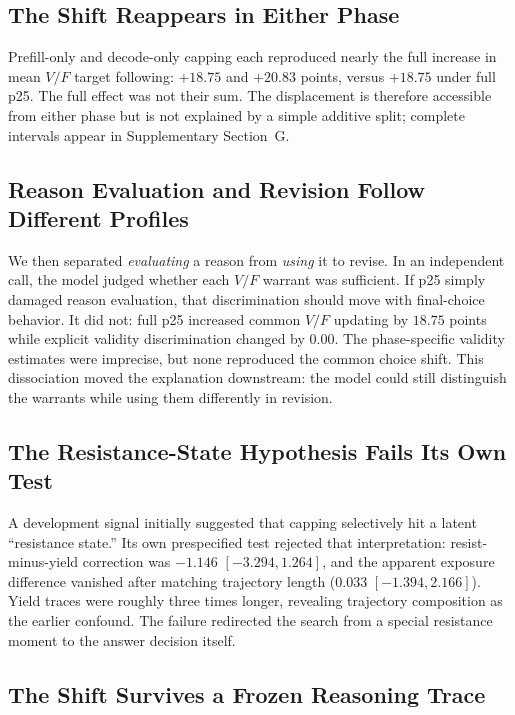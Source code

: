 \documentclass[letterpaper]{article} %
\begin{document}
\subsection{The Shift Reappears in Either Phase}

Prefill-only and decode-only capping each reproduced nearly the full increase in mean $V/F$ target following: $+18.75$ and $+20.83$ points, versus $+18.75$ under full p25. The full effect was not their sum. The displacement is therefore accessible from either phase but is not explained by a simple additive split; complete intervals appear in Supplementary Section~G.

\subsection{Reason Evaluation and Revision Follow Different Profiles}

We then separated \emph{evaluating} a reason from \emph{using} it to revise. In an independent call, the model judged whether each $V/F$ warrant was sufficient. If p25 simply damaged reason evaluation, that discrimination should move with final-choice behavior. It did not: full p25 increased common $V/F$ updating by $18.75$ points while explicit validity discrimination changed by $0.00$. The phase-specific validity estimates were imprecise, but none reproduced the common choice shift. This dissociation moved the explanation downstream: the model could still distinguish the warrants while using them differently in revision.

\subsection{The Resistance-State Hypothesis Fails Its Own Test}

A development signal initially suggested that capping selectively hit a latent ``resistance state.'' Its own prespecified test rejected that interpretation: resist-minus-yield correction was $-1.146$ $[-3.294,1.264]$, and the apparent exposure difference vanished after matching trajectory length ($0.033$ $[-1.394,2.166]$). Yield traces were roughly three times longer, revealing trajectory composition as the earlier confound. The failure redirected the search from a special resistance moment to the answer decision itself.

\subsection{The Shift Survives a Frozen Reasoning Trace}
\end{document}
